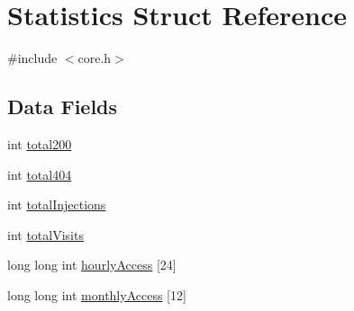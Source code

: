 \hypertarget{struct_statistics}{\section{Statistics Struct Reference}
\label{struct_statistics}
}


{\ttfamily \#include $<$core.\-h$>$}

\subsection*{Data Fields}
\begin{DoxyCompactItemize}
\item 
int \hyperlink{struct_statistics_a3d9f2a6c24570236f6edd05dff804d03}{total200}
\item 
int \hyperlink{struct_statistics_a62d495d9811a2a8a3c0d9d3b4cc201f0}{total404}
\item 
int \hyperlink{struct_statistics_aefcb67879169684ac40167225767bdbe}{total\-Injections}
\item 
int \hyperlink{struct_statistics_a730b68baeee01715620647f348bb789f}{total\-Visits}
\item 
long long int \hyperlink{struct_statistics_a5d2c00ae7b41276b97cf4a2be29001c1}{hourly\-Access} \mbox{[}24\mbox{]}
\item 
long long int \hyperlink{struct_statistics_ad0d0d2ffdddb1d6259d24ee70abfd4c4}{monthly\-Access} \mbox{[}12\mbox{]}
\end{DoxyCompactItemize}



